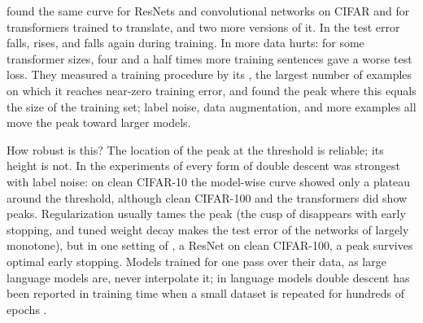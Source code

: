 \begin{refsection}
\Textcite{NakkiranEtAl2020} found the same curve for ResNets and convolutional networks on CIFAR and for transformers trained to translate, and two more versions of it. In  the test error falls, rises, and falls again during training. In  more data hurts: for some transformer sizes, four and a half times more training sentences gave a worse test loss. They measured a training procedure by its , the largest number of examples on which it reaches near-zero training error, and found the peak where this equals the size of the training set; label noise, data augmentation, and more examples all move the peak toward larger models.


How robust is this? The location of the peak at the threshold is reliable; its height is not. In the experiments of \textcite{NakkiranEtAl2020} every form of double descent was strongest with label noise: on clean CIFAR-10 the model-wise curve showed only a plateau around the threshold, although clean CIFAR-100 and the transformers did show peaks. Regularization usually tames the peak (the cusp of \textcite{SpiglerEtAl2019} disappears with early stopping, and tuned weight decay makes the test error of the networks of \textcite{NakkiranEtAl2021} largely monotone), but in one setting of \textcite{NakkiranEtAl2020}, a ResNet on clean CIFAR-100, a peak survives optimal early stopping. Models trained for one pass over their data, as large language models are, never interpolate it; in language models double descent has been reported in training time when a small dataset is repeated for hundreds of epochs \parencite{MuennighoffEtAl2023}.


\end{refsection}
